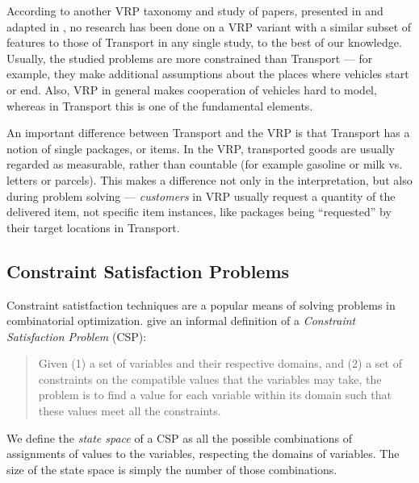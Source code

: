 According to another VRP taxonomy and study of papers, presented in \citet{Eksioglu2009} and adapted in \citet{Braekers2016}, no research has been done on a VRP variant with a similar subset of features to those of Transport in any single study, to the best of our knowledge.
Usually, the studied problems are more constrained than Transport --- for example, they make additional assumptions about the places where vehicles start or end. Also, VRP in general
makes cooperation of vehicles hard to model, whereas in Transport this is one of the fundamental elements.


An important difference between Transport and the VRP is that Transport has a notion of single packages, or items. In the VRP, transported goods are usually regarded as measurable, rather than countable (for example gasoline or milk vs. letters or parcels). This makes a difference not only in the
interpretation, but also during problem solving --- \textit{customers} in VRP usually request
a quantity of the delivered item, not specific item instances, like packages being ``requested''
by their target locations in Transport.

\subsection{Constraint Satisfaction Problems}\label{csp}

Constraint satistfaction techniques are a popular means of solving problems in combinatorial optimization. \citet[Section~8.1]{Ghallab2004} give an informal definition of a \textit{Constraint Satisfaction
Problem} (CSP):

\begin{quote}
Given (1) a set of variables and their respective domains, and (2) a set of constraints on the compatible values that the variables may take, the problem is to find a value for each variable within its domain such that these values meet all the constraints.
\end{quote}

We define the \textit{state space} of a CSP as all the possible combinations of assignments of values to the variables, respecting the domains of variables.
The size of the state space is simply the number of those combinations.

